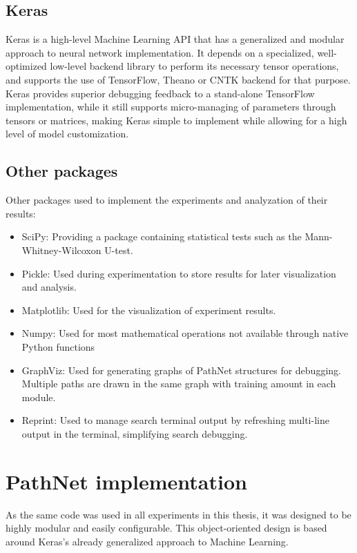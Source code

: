 \subsection{Keras}
Keras\cite{keras} is a high-level Machine Learning API that has a generalized and modular approach to neural network implementation. It depends on a specialized, well-optimized low-level backend library to perform its necessary tensor operations, and supports the use of TensorFlow, Theano or CNTK backend for that purpose. Keras provides superior debugging feedback to a stand-alone TensorFlow implementation, while it still supports micro-managing of parameters through tensors or matrices, making Keras simple to implement while allowing for a high level of model customization.

\subsection{Other packages}
Other packages used to implement the experiments and analyzation of their results:
\begin{itemize}
    \item SciPy: Providing a package containing statistical tests such as the Mann-Whitney-Wilcoxon U-test.
    \item Pickle: Used during experimentation to store results for later visualization and analysis.
    \item Matplotlib: Used for the visualization of experiment results.
    \item Numpy: Used for most mathematical operations not available through native Python functions 
    \item GraphViz: Used for generating graphs of PathNet structures for debugging. Multiple paths are drawn in the same graph with training amount in each module.
    \item Reprint: Used to manage search terminal output by refreshing multi-line output in the terminal, simplifying search debugging.
\end{itemize}

\section{PathNet implementation}
As the same code was used in all experiments in this thesis, it was designed to be highly modular and easily configurable. This object-oriented design is based around Keras's already generalized approach to Machine Learning.

